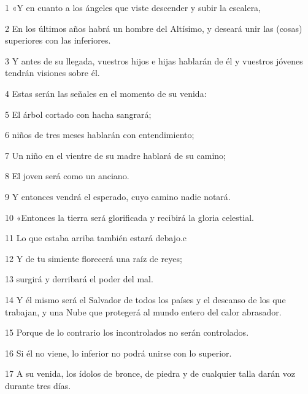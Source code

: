 \par 1 «Y en cuanto a los ángeles que viste descender y subir la escalera,

\par 2 En los últimos años habrá un hombre del Altísimo, y deseará unir las (cosas) superiores con las inferiores.

\par 3 Y antes de su llegada, vuestros hijos e hijas hablarán de él y vuestros jóvenes tendrán visiones sobre él.

\par 4 Estas serán las señales en el momento de su venida:

\par 5 El árbol cortado con hacha sangrará;

\par 6 niños de tres meses hablarán con entendimiento;

\par 7 Un niño en el vientre de su madre hablará de su camino;

\par 8 El joven será como un anciano.

\par 9 Y entonces vendrá el esperado, cuyo camino nadie notará.

\par 10 «Entonces la tierra será glorificada y recibirá la gloria celestial.

\par 11 Lo que estaba arriba también estará debajo.c

\par 12 Y de tu simiente florecerá una raíz de reyes;

\par 13 surgirá y derribará el poder del mal.

\par 14 Y él mismo será el Salvador de todos los países y el descanso de los que trabajan, y una Nube que protegerá al mundo entero del calor abrasador.

\par 15 Porque de lo contrario los incontrolados no serán controlados.

\par 16 Si él no viene, lo inferior no podrá unirse con lo superior.

\par 17 A su venida, los ídolos de bronce, de piedra y de cualquier talla darán voz durante tres días.

